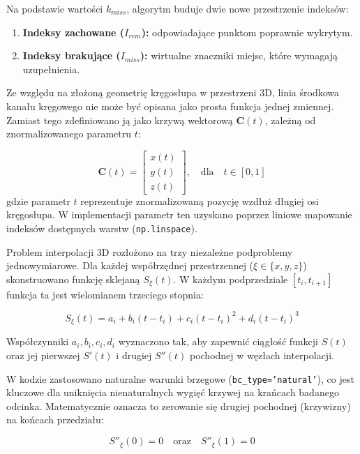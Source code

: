 Na podstawie wartości $k_{miss}$, algorytm buduje dwie nowe przestrzenie indeksów:
\begin{enumerate}
    \item \textbf{Indeksy zachowane ($I_{rem}$):} odpowiadające punktom poprawnie wykrytym.
    \item \textbf{Indeksy brakujące ($I_{miss}$):} wirtualne znaczniki miejsc, które wymagają uzupełnienia.
\end{enumerate}

Ze względu na złożoną geometrię kręgosłupa w przestrzeni 3D, linia środkowa kanału kręgowego nie może być opisana jako prosta funkcja jednej zmiennej.
Zamiast tego zdefiniowano ją jako krzywą wektorową $\mathbf{C}(t)$, zależną od znormalizowanego parametru $t$:

\begin{equation}
    \mathbf{C}(t) = \begin{bmatrix}
                        x(t) \\ y(t) \\ z(t)
    \end{bmatrix}, \quad \text{dla} \quad t \in [0, 1]
\end{equation}
gdzie parametr $t$ reprezentuje znormalizowaną pozycję wzdłuż długiej osi kręgosłupa.
W implementacji parametr ten uzyskano poprzez liniowe mapowanie indeksów dostępnych warstw (\texttt{np.linspace}).

Problem interpolacji 3D rozłożono na trzy niezależne podproblemy jednowymiarowe.
Dla każdej współrzędnej przestrzennej ($\xi \in \{x, y, z\}$) skonstruowano funkcję sklejaną $S_\xi(t)$.
W każdym podprzedziale $[t_i, t_{i+1}]$ funkcja ta jest wielomianem trzeciego stopnia:

\begin{equation}
    S_\xi(t) = a_i + b_i(t - t_i) + c_i(t - t_i)^2 + d_i(t - t_i)^3
\end{equation}

Współczynniki $a_i, b_i, c_i, d_i$ wyznaczono tak, aby zapewnić ciągłość funkcji $S(t)$ oraz jej pierwszej $S'(t)$ i drugiej $S''(t)$ pochodnej w węzłach interpolacji.

W kodzie zastosowano naturalne warunki brzegowe (\texttt{bc\_type='natural'}), co jest kluczowe dla uniknięcia nienaturalnych wygięć krzywej na krańcach badanego odcinka.
Matematycznie oznacza to zerowanie się drugiej pochodnej (krzywizny) na końcach przedziału:

\begin{equation}
    S''_\xi(0) = 0 \quad \text{oraz} \quad S''_\xi(1) = 0
\end{equation}

